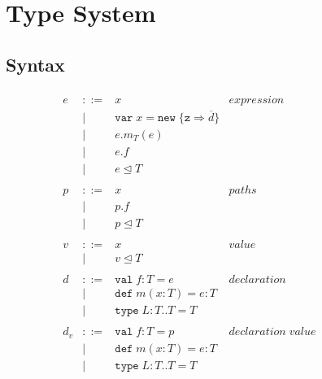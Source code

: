 \documentclass{llncs}
\begin{document}
\section{Type System}
	\label{s:type_sys}


\subsection{Syntax}


\begin{figure}[h]
\[
\begin{array}{lll}
\begin{array}{lllr}
e & ::= & x & expression \\
& | & \texttt{var} \; x = \texttt{new} \; \{\texttt{z} \Rightarrow \overline{d}\}&\\
& | & e.m_T(e) &\\
& | & e.f &\\
& | & e \unlhd T&\\
&&\\
p & ::= & x & paths \\
& | & p.f &\\
& | & p \unlhd T &\\
&&\\
v & ::= & x & value \\
& | & v \unlhd T &\\
&&\\
d & ::= & \texttt{val} \; f : T = e & declaration \\
  & |   & \texttt{def} \; m(x:T) = e : T &\\
  & |   & \texttt{type} \; L : T .. T = T &\\
&&\\
d_v & ::= & \texttt{val} \; f : T = p & declaration \; value \\
  & |   & \texttt{def} \; m(x:T) = e : T &\\
  & |   & \texttt{type} \; L : T .. T = T &\\
&&\\
 \end{array}
& ~~~~~~
&
\begin{array}{lllr}

\end{array}
\end{array}\]
\end{figure}
\end{document}
